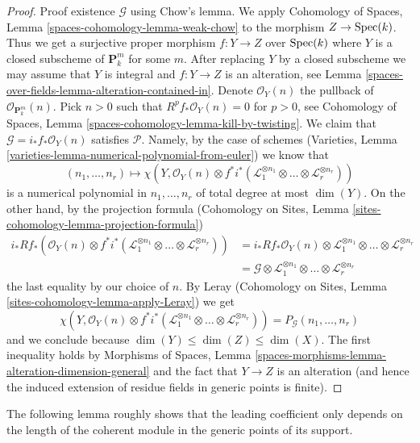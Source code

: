\begin{proof}
\medskip\noindent
Proof existence $\mathcal{G}$ using Chow's lemma. We apply
Cohomology of Spaces, Lemma \ref{spaces-cohomology-lemma-weak-chow}
to the morphism $Z \to \operatorname{Spec}(k)$. Thus we get a
surjective proper morphism $f : Y \to Z$ over $\operatorname{Spec}(k)$
where $Y$ is a closed subscheme of $\mathbf{P}^m_k$ for some $m$.
After replacing $Y$ by a closed subscheme we may assume that $Y$
is integral and $f : Y \to Z$ is an alteration, see
Lemma \ref{spaces-over-fields-lemma-alteration-contained-in}.
Denote $\mathcal{O}_Y(n)$ the pullback of $\mathcal{O}_{\mathbf{P}^m_k}(n)$.
Pick $n > 0$ such that $R^pf_*\mathcal{O}_Y(n) = 0$
for $p > 0$, see Cohomology of Spaces, Lemma
\ref{spaces-cohomology-lemma-kill-by-twisting}.
We claim that $\mathcal{G} = i_*f_*\mathcal{O}_Y(n)$ satisfies $\mathcal{P}$.
Namely, by the case of schemes
(Varieties, Lemma \ref{varieties-lemma-numerical-polynomial-from-euler})
we know that
$$
(n_1, \ldots, n_r)
\longmapsto
\chi(Y, \mathcal{O}_Y(n) \otimes
f^*i^*(\mathcal{L}_1^{\otimes n_1} \otimes \ldots \otimes
\mathcal{L}_r^{\otimes n_r}))
$$
is a numerical polynomial in $n_1, \ldots, n_r$ of total degree at
most $\dim(Y)$. On the other hand, by the projection formula
(Cohomology on Sites, Lemma \ref{sites-cohomology-lemma-projection-formula})
\begin{align*}
i_*Rf_*\left(
\mathcal{O}_Y(n) \otimes
f^*i^*(\mathcal{L}_1^{\otimes n_1} \otimes \ldots \otimes
\mathcal{L}_r^{\otimes n_r})\right)
& =
i_*Rf_*\mathcal{O}_Y(n) \otimes
\mathcal{L}_1^{\otimes n_1} \otimes \ldots \otimes
\mathcal{L}_r^{\otimes n_r} \\
& =
\mathcal{G} \otimes \mathcal{L}_1^{\otimes n_1} \otimes \ldots \otimes
\mathcal{L}_r^{\otimes n_r}
\end{align*}
the last equality by our choice of $n$. By
Leray (Cohomology on Sites, Lemma \ref{sites-cohomology-lemma-apply-Leray})
we get
$$
\chi(Y, \mathcal{O}_Y(n) \otimes
f^*i^*(\mathcal{L}_1^{\otimes n_1} \otimes \ldots \otimes
\mathcal{L}_r^{\otimes n_r})) =
P_\mathcal{G}(n_1, \ldots, n_r)
$$
and we conclude because $\dim(Y) \leq \dim(Z) \leq \dim(X)$.
The first inequality holds by
Morphisms of Spaces, Lemma
\ref{spaces-morphisms-lemma-alteration-dimension-general}
and the fact that $Y \to Z$ is an alteration (and hence the
induced extension of residue fields in generic points is finite).
\end{proof}

The following lemma roughly shows that the leading coefficient only depends
on the length of the coherent module in the generic points of its
support.

